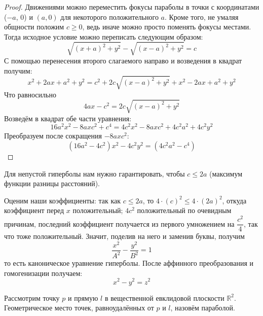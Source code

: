 \documentclass[11pt]{article}
\begin{document}
    \begin{proof}
    Движениями можно переместить фокусы параболы в точки с координатами ($-a$, $0$) и $(a, 0)$ для некоторого положительного $a$. Кроме того, не умаляя общности положим $c \geq 0$, ведь иначе можно просто поменять фокусы местами. Тогда исходное условие можно переписать следующим образом:
    \begin{equation*}
        \sqrt{(x + a)^2 + y^2} - \sqrt{(x - a)^2 + y^2} = c
    \end{equation*}
    С помощью перенесения второго слагаемого направо и возведения в квадрат получим:
    \begin{equation*}
        x^2 + 2ax + a^2 + y^2 = c^2 + 2c\sqrt{(x - a)^2 + y^2} + x^2 - 2ax + a^2 + y^2
    \end{equation*}
    Что равносильно
    \begin{equation*}
        4ax - c^2 = 2c\sqrt{(x - a)^2 + y^2}
    \end{equation*}
    Возведём в квадрат обе части уравнения:
    \begin{equation*}
        16a^2x^2 -8axc^2 + c^4 = 4c^2x^2 - 8axc^2 + 4c^2a^2 + 4c^2y^2
    \end{equation*}
    Преобразуем после сокращения $-8axc^2$:
    \begin{equation*}
        (16a^2 - 4c^2)x^2 - 4c^2y^2 = (4c^2a^2 - c^4)
    \end{equation*}
    \end{proof}

    \begin{remark}
        Для непустой гиперболы нам нужно гарантировать, чтобы $c \leq 2a$ (максимум функции разницы расстояний).
    \end{remark}

    \begin{remark}
    Оценим наши коэффициенты: так как $c \leq 2a$, то $4\cdot(c)^2 \leq 4\cdot(2a)^2$, откуда коэффициент перед $x$ положительный; $4c^2$ положительный по очевидным причинам, последний коэффициент получается из первого умножением на $\dfrac{c^2}{4}$, так что тоже положительный. Значит, поделив на него и заменив буквы, получим
    \begin{equation*}
        \dfrac{x^2}{A^2} - \dfrac{y^2}{B^2} = 1
    \end{equation*}
    то есть каноническое уравнение гиперболы. После аффинного преобразования и гомогенизации получаем:
    \begin{equation*}
        x^2 - y^2 = z^2
    \end{equation*}
    \end{remark}
    \begin{definition}
    Рассмотрим точку $p$ и прямую $l$ в вещественной евклидовой плоскости $\mathbb{R}^2$. Геометрическое место точек, равноудалённых от $p$ и $l$, назовём параболой.
    \end{definition}
\end{document}

